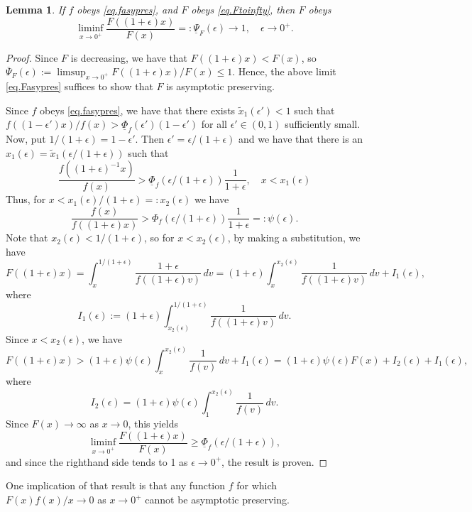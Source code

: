 \documentclass[a4paper,10pt,reqno]{amsart}
\numberwithin{equation}{section}
\newtheorem{lemma}{Lemma}
\theoremstyle{definition}
\theoremstyle{remark}
\DeclareMathOperator{\1}{\mathbbm 1}
\begin{document}
	\begin{lemma} \label{lem.Fap}
		If $f$ obeys \eqref{eq.fasypres}, and $F$ obeys \eqref{eq.Ftoinfty}, then $F$ obeys
		\begin{equation} \label{eq.Fasypres}
			\liminf_{x\to 0^+} \frac{F((1+\epsilon)x)}{F(x)}=:\underline{\Psi}_F(\epsilon)\to 1, \quad \epsilon\to 0^+. 
		\end{equation}
	\end{lemma}
	\begin{proof}
		Since $F$ is decreasing, we have that $F((1+\epsilon)x)<F(x)$, so $\overline{\Psi}_F(\epsilon):=\limsup_{x\to 0^+} F((1+\epsilon)x)/F(x)\leq 1$. Hence, the above limit \eqref{eq.Fasypres} suffices to show that $F$ is asymptotic preserving. 
		
		Since  $f$ obeys \eqref{eq.fasypres}, we have that there exists $\tilde{x}_1(\epsilon')<1$ such that $f((1-\epsilon')x)/f(x)>\underline{\Phi}_f(\epsilon')(1-\epsilon')$ for all $\epsilon'\in (0,1)$ sufficiently small. Now, put $1/(1+\epsilon)=1-\epsilon'$. Then $\epsilon'=\epsilon/(1+\epsilon)$ and we have that there is an $x_1(\epsilon)= \tilde{x}_1(\epsilon/(1+\epsilon))$ such that 
		\[
		\frac{f((1+\epsilon)^{-1}x)}{f(x)}>\underline{\Phi}_f(\epsilon/(1+\epsilon))\frac{1}{1+\epsilon}, \quad x<x_1(\epsilon)
		\]	
		Thus, for $x<x_1(\epsilon)/(1+\epsilon)=:x_2(\epsilon)$ we have 
		\[
		\frac{f(x)}{f((1+\epsilon)x)}>\Phi_f(\epsilon/(1+\epsilon))\frac{1}{1+\epsilon}=:\psi(\epsilon).
		\]
		Note that $x_2(\epsilon)<1/(1+\epsilon)$, so for $x<x_2(\epsilon)$, by making a substitution, we have 
		\[
		F((1+\epsilon)x) = \int_{x}^{1/(1+\epsilon)} \frac{1+\epsilon}{f((1+\epsilon)v)}\,dv
		=(1+\epsilon)\int_x^{x_2(\epsilon)} \frac{1}{f((1+\epsilon)v)}\,dv+ I_1(\epsilon),
		\]
		where 
		\[
		I_1(\epsilon):=(1+\epsilon)\int_{x_2(\epsilon)}^{1/(1+\epsilon)} \frac{1}{f((1+\epsilon)v)}\,dv.
		\]
		Since $x<x_2(\epsilon)$, we have 
		\[
		F((1+\epsilon)x) >(1+\epsilon)\psi(\epsilon)\int_x^{x_2(\epsilon)} \frac{1}{f(v)}\,dv+ I_1(\epsilon)
		= (1+\epsilon)\psi(\epsilon)F(x)+I_2(\epsilon)+I_1(\epsilon),
		\]
		where 
		\[
		I_2(\epsilon)=(1+\epsilon)\psi(\epsilon)\int_1^{x_2(\epsilon)} \frac{1}{f(v)}\,dv.
		\]
		Since $F(x)\to \infty$ as $x\to 0$, this yields
		\[
		\liminf_{x\to 0^+}\frac{F((1+\epsilon)x)}{F(x)}\geq \underline{\Phi}_f(\epsilon/(1+\epsilon)),
		\]
		and since the righthand side tends to 1 as $\epsilon\to 0^+$, the result is proven.
	\end{proof}
	
	One implication of that result is that any function $f$ for which 
	$F(x)f(x)/x\to 0$ as $x\to 0^+$ cannot be asymptotic preserving. 
	
\end{document}
